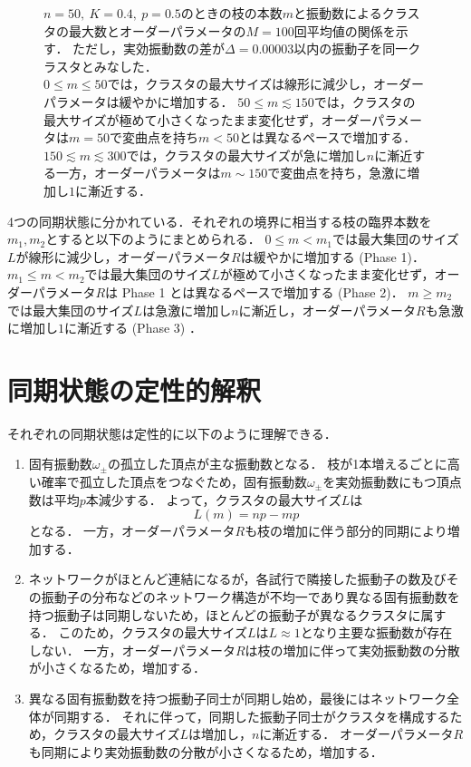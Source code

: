 \documentclass[../main]{subfiles}
\begin{document}
\begin{figure}[tbp]
\begin{minipage}[b]{\linewidth}
    \end{minipage}
    \caption{$n=50,\ K=0.4,\ p=0.5$のときの枝の本数$m$と振動数によるクラスタの最大数とオーダーパラメータの$M=100$回平均値の関係を示す．
    ただし，実効振動数の差が$\Delta=0.00003$以内の振動子を同一クラスタとみなした．\\
    $0\leq m\leq 50$では，クラスタの最大サイズは線形に減少し，オーダーパラメータは緩やかに増加する．
    $50\leq m\lesssim 150$では，クラスタの最大サイズが極めて小さくなったまま変化せず，オーダーパラメータは$m=50$で変曲点を持ち$m<50$とは異なるペースで増加する．
    $150\lesssim m\lesssim 300$では，クラスタの最大サイズが急に増加し$n$に漸近する一方，オーダーパラメータは$m\sim 150$で変曲点を持ち，急激に増加し$1$に漸近する．
    }
    \label{fig:edge-cutting-K04}
\end{figure}

4つの同期状態に分かれている．それぞれの境界に相当する枝の臨界本数を$m_1,m_2$とすると以下のようにまとめられる．
$0\leq m<m_1$では最大集団のサイズ$L$が線形に減少し，オーダーパラメータ$R$は緩やかに増加する (Phase 1)．
$m_1\leq m< m_2$では最大集団のサイズ$L$が極めて小さくなったまま変化せず，オーダーパラメータ$R$は Phase 1 とは異なるペースで増加する (Phase 2)．
$m\geq m_2 $では最大集団のサイズ$L$は急激に増加し$n$に漸近し，オーダーパラメータ$R$も急激に増加し$1$に漸近する (Phase 3) ．
\section{同期状態の定性的解釈}
それぞれの同期状態は定性的に以下のように理解できる．
\renewcommand{\labelenumi}{Phase \theenumi}
\begin{enumerate}
    \item 固有振動数$\omega_\pm$の孤立した頂点が主な振動数となる．
    枝が1本増えるごとに高い確率で孤立した頂点をつなぐため，固有振動数$\omega_\pm$を実効振動数にもつ頂点数は平均$p$本減少する．
    よって，クラスタの最大サイズ$L$は
    \[L(m)=np-mp\]
    となる．
    一方，オーダーパラメータ$R$も枝の増加に伴う部分的同期により増加する．
    \item ネットワークがほとんど連結になるが，各試行で隣接した振動子の数及びその振動子の分布などのネットワーク構造が不均一であり異なる固有振動数を持つ振動子は同期しないため，ほとんどの振動子が異なるクラスタに属する．
    このため，クラスタの最大サイズ$L$は$L\approx 1$となり主要な振動数が存在しない．
    一方，オーダーパラメータ$R$は枝の増加に伴って実効振動数の分散が小さくなるため，増加する．
    \item 異なる固有振動数を持つ振動子同士が同期し始め，最後にはネットワーク全体が同期する．
    それに伴って，同期した振動子同士がクラスタを構成するため，クラスタの最大サイズ$L$は増加し，$n$に漸近する．
    オーダーパラメータ$R$も同期により実効振動数の分散が小さくなるため，増加する．
\end{enumerate}
\end{document}
